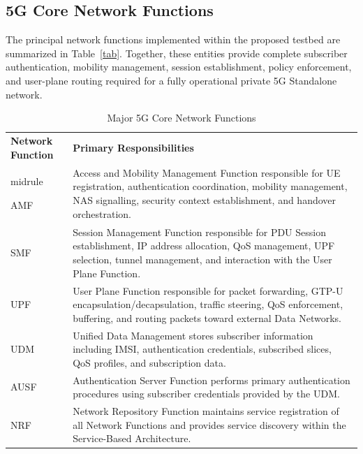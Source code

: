 \documentclass[12pt,a4paper]{article}\usepackage[a4paper,margin=1in]{geometry}\usepackage{graphicx}\usepackage{longtable}\usepackage{booktabs}\usepackage{hyperref}\usepackage{enumitem}\usepackage{amsmath}\usepackage{tikz}\usepackage{pgfgantt}\usepackage{setspace}\setstretch{1.15}\usetikzlibrary{positioning,arrows.meta,shapes.geometric}
\begin{document}
	\vspace{0.4cm}
	
	\subsection{5G Core Network Functions}
	
	The principal network functions implemented within the proposed testbed are summarized in Table~\ref{tab}. Together, these entities provide complete subscriber authentication, mobility management, session establishment, policy enforcement, and user-plane routing required for a fully operational private 5G Standalone network.
	
	\begin{table}[h]
		\centering
		\caption{Major 5G Core Network Functions}
		
		\begin{tabular}{p{3.2cm}p{10.2cm}}
			\toprule\textbf{Network Function} & \textbf{Primary Responsibilities} 
			\\midrule
			
			AMF &
			Access and Mobility Management Function responsible for UE registration, authentication coordination, mobility management, NAS signalling, security context establishment, and handover orchestration. \\
			
			SMF &
			Session Management Function responsible for PDU Session establishment, IP address allocation, QoS management, UPF selection, tunnel management, and interaction with the User Plane Function. \\
			
			UPF &
			User Plane Function responsible for packet forwarding, GTP-U encapsulation/decapsulation, traffic steering, QoS enforcement, buffering, and routing packets toward external Data Networks. \\
			
			UDM &
			Unified Data Management stores subscriber information including IMSI, authentication credentials, subscribed slices, QoS profiles, and subscription data. \\
			
			AUSF &
			Authentication Server Function performs primary authentication procedures using subscriber credentials provided by the UDM. \\
			
			NRF &
			Network Repository Function maintains service registration of all Network Functions and provides service discovery within the Service-Based Architecture. \\
			

\end{tabular}
\end{table}
\end{document}
